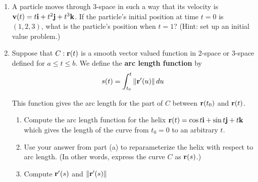 \documentclass[12pt]{article}
\newif\ifans
\begin{document}
\begin{enumerate}
\ifans{\fbox{${\bf r}(t)=\langle -e^{-t}+3, t^3-8 \rangle$}} \fi

\item A particle moves through 3-space in such a way that its velocity is ${\bf v}(t)=t{\bf i}+t^2{\bf j}+t^3{\bf k}$.  If the particle's initial position at time $t=0$ is $(1,2,3)$, what is the particle's position when $t=1$? (Hint: set up an initial value problem.)

\ifans{\fbox{\parbox{1\linewidth}{The position of the particle at time $t=1$ is $(x,y,z)=\left( \frac{3}{2}, \frac{7}{3}, \frac{13}{4}\right)$.  Detailed Solution: \textcolor{blue}{\href{http://www.math.drexel.edu/classes/Calculus/resources/Math200HW/Solutions/08_200_Vector_Functions_14.pdf}{Here}}}}} \fi

\item Suppose that $C: {\bf r}(t)$ is a smooth vector valued function in 2-space or 3-space defined for $a \leq t \leq b$.  We define the {\bf arc length function} by $$s(t)=\int_{t_0}^t \|{\bf r}^{\prime}(u)\| \,du$$

This function gives the arc length for the part of $C$ between ${\bf r}(t_0)$ and ${\bf r}(t)$.

\begin{enumerate}

\item Compute the arc length function for the helix ${\bf r}(t)=\cos{t} {\bf i}+\sin{t} {\bf j}+t {\bf k}$ which gives the length of the curve from $t_0=0$ to an arbitrary $t$.

\ifans{\fbox{$s=\sqrt{2}t$}} \fi

\item Use your answer from part (a) to reparameterize the helix with respect to arc length. (In other words, express the curve $C$ as ${\bf r}(s)$.)

\ifans{\fbox{${\bf r}(s)=\cos\left(\frac{s}{\sqrt{2}}\right){\bf i}+\sin\left(\frac{s}{\sqrt{2}}\right){\bf j}+\frac{s}{\sqrt{2}}{\bf k}$}} \fi

\item Compute ${\bf r}^{\prime}(s)$ and $\|{\bf r}^{\prime}(s)\|$

\ifans{\fbox{\parbox{1\linewidth}{${\bf r}^{\prime}(s)=-\frac{1}{\sqrt{2}}\sin\left(\frac{s}{\sqrt{2}}\right){\bf i}+\frac{1}{\sqrt{2}}\cos\left(\frac{s}{\sqrt{2}}\right){\bf j}+\frac{1}{\sqrt{2}}{\bf k}$ and $\|{\bf r}^{\prime}(s)\|=1$\\
In fact, whenever a curve is parameterized in terms of arc length, it can be shown using the chain rule that all tangent vectors will be unit tangent vectors.
}}} \fi


\end{enumerate}
\end{enumerate}
\end{document}
